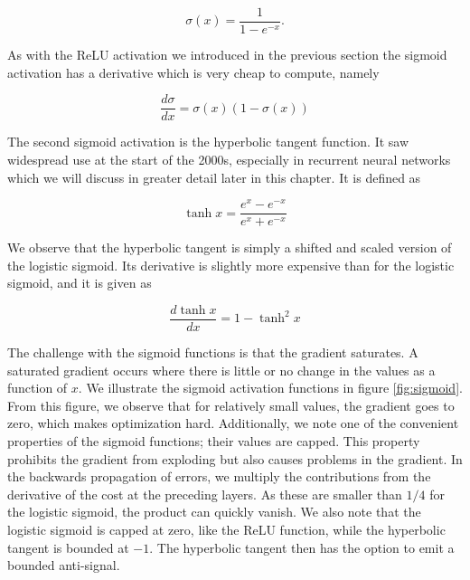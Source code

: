 \begin{equation}
\sigma(x) = \frac{1}{1-e^{-x}}.
\end{equation}

\noindent As with the ReLU activation we introduced in the previous section the sigmoid activation has a derivative which is very cheap to compute, namely

\begin{equation}
\frac{d\sigma}{dx} = \sigma(x)(1 - \sigma(x))
\end{equation}

\noindent The second sigmoid activation is the hyperbolic tangent function. It saw widespread use at the start of the 2000s, especially in recurrent neural networks which we will discuss in greater detail later in this chapter. It is defined as 

\begin{equation}
\tanh x = \frac{e^x - e^{-x}}{e^x + e^{-x}}
\end{equation}

\noindent We observe that the hyperbolic tangent is simply a shifted and scaled version of the logistic sigmoid. Its derivative is slightly more expensive than for the logistic sigmoid, and it is given as 

\begin{equation}
\frac{d \tanh x}{d x}  = 1-\tanh^2 x
\end{equation}

\noindent The challenge with the sigmoid functions is that the gradient saturates. A saturated gradient occurs where there is little or no change in the values as a function of $x$. We illustrate the sigmoid activation functions in figure \ref{fig:sigmoid}. From this figure, we observe that for relatively small values, the gradient goes to zero, which makes optimization hard. Additionally, we note one of the convenient properties of the sigmoid functions; their values are capped. This property prohibits the gradient from exploding but also causes problems in the gradient. In the backwards propagation of errors, we multiply the contributions from the derivative of the cost at the preceding layers. As these are smaller than $1/4$ for the logistic sigmoid, the product can quickly vanish.  We also note that the logistic sigmoid is capped at zero, like the ReLU function, while the hyperbolic tangent is bounded at $-1$. The hyperbolic tangent then has the option to emit a bounded anti-signal.

